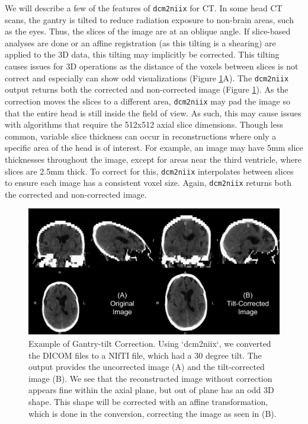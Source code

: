 \documentclass[utf8]{frontiersSCNS}
\begin{document}
We will describe a few of the features of \texttt{dcm2niix} for CT. In some head CT scans, the gantry is tilted to reduce radiation exposure to non-brain areas, such as the eyes. Thus, the slices of the image are at an oblique angle. If slice-based analyses are done or an affine registration (as this tilting is a shearing) are applied to the 3D data, this tilting may implicitly be corrected. This tilting causes issues for 3D operations as the distance of the voxels between slices is not correct and especially can show odd visualizations (Figure \ref{fig:gantry}A). The \texttt{dcm2niix} output returns both the corrected and non-corrected image (Figure \ref{fig:gantry}). As the correction moves the slices to a different area, \texttt{dcm2niix} may pad the image so that the entire head is still inside the field of view. As such, this may cause issues with algorithms that require the 512x512 axial slice dimensions. Though less common, variable slice thickness can occur in reconstructions where only a specific area of the head is of interest. For example, an image may have 5mm slice thicknesses throughout the image, except for areas near the third ventricle, where slices are 2.5mm thick. To correct for this, \texttt{dcm2niix} interpolates between slices to ensure each image has a consistent voxel size. Again, \texttt{dcm2niix} returns both the corrected and non-corrected image.

\begin{figure}
\includegraphics[width=1\linewidth]{frontiers_files/figure-latex/gantry-1} \caption{Example of Gantry-tilt Correction.  Using `dcm2niix`, we converted the DICOM files to a NIfTI file, which had a 30 degree tilt.  The output provides the uncorrected image (A) and the tilt-corrected image (B).  We see that the reconstructed image without correction appears fine within the axial plane, but out of plane has an odd 3D shape.  This shape will be corrected with an affine transformation, which is done in the conversion, correcting the image as seen in (B). }\label{fig:gantry}
\end{figure}
\end{document}

